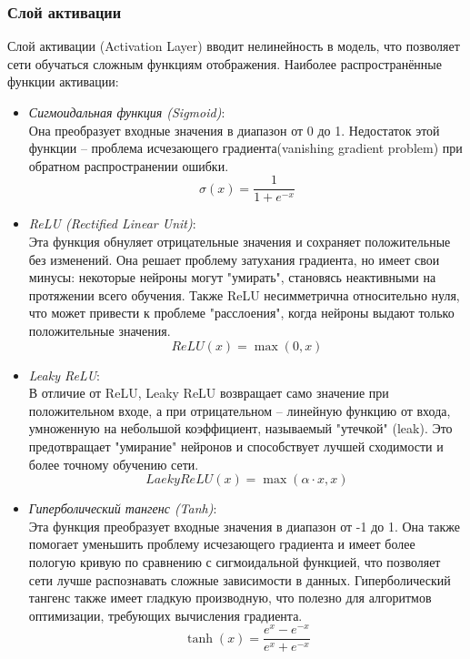 \subsubsection{Слой активации}
Слой активации (Activation Layer) вводит нелинейность в модель, что позволяет сети обучаться сложным функциям отображения. 
Наиболее распространённые функции активации:
\begin{itemize}[]
	\item \textit{Сигмоидальная функция (Sigmoid)}:\\
	Она преобразует входные значения в диапазон от 0 до 1. Недостаток этой функции – проблема исчезающего градиента(vanishing gradient problem) при обратном распространении ошибки.
	\begin{equation}
		\sigma(x) = \frac{1}{1+e^{-x}}
	\end{equation}
	\item \textit{ReLU (Rectified Linear Unit)}:\\
	Эта функция обнуляет отрицательные значения и сохраняет положительные без изменений. Она решает проблему затухания градиента, но имеет свои минусы: некоторые нейроны могут "умирать", становясь неактивными на протяжении всего обучения. Также ReLU несимметрична относительно нуля, что может привести к проблеме "расслоения", когда нейроны выдают только положительные значения.
	\begin{equation}
		ReLU(x) = \max(0, x)
	\end{equation}
	\item \textit{Leaky ReLU}:\\
	В отличие от ReLU, Leaky ReLU возвращает само значение при положительном входе, а при отрицательном – линейную функцию от входа, умноженную на небольшой коэффициент, называемый "утечкой" (leak). Это предотвращает "умирание" нейронов и способствует лучшей сходимости и более точному обучению сети.
	\begin{equation}
		Laeky ReLU(x) = \max(\alpha\cdot x, x)
	\end{equation}
	\item \textit{Гиперболический тангенс (Tanh)}:\\
	Эта функция преобразует входные значения в диапазон от -1 до 1. Она также помогает уменьшить проблему исчезающего градиента и имеет более пологую кривую по сравнению с сигмоидальной функцией, что позволяет сети лучше распознавать сложные зависимости в данных. Гиперболический тангенс также имеет гладкую производную, что полезно для алгоритмов оптимизации, требующих вычисления градиента.
	\begin{equation}
		\tanh(x) = \frac{e^x-e^{-x}}{e^x+e^{-x}}
	\end{equation}
\end{itemize}

